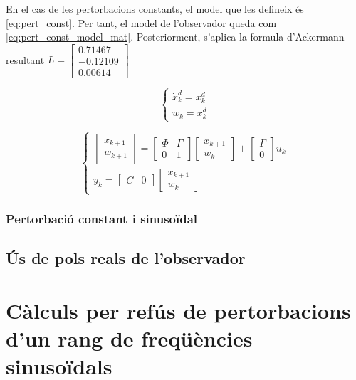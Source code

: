 \documentclass[12pt,a4paper,final,twoside,openright]{report}
\begin{document}
En el cas de les pertorbacions constants, el model que les defineix és \eqref{eq:pert_const}. Per tant, el model de l'observador queda com \eqref{eq:pert_const_model_mat}. Posteriorment, s'aplica la formula d'Ackermann resultant $L=\begin{bmatrix}
0.71467\\
-0.12109\\
0.00614
\end{bmatrix}$

\begin{equation}\label{eq:pert_const}
\left\{
\begin{array}{lr}
\dot{x}^d_k = x^d_k\\
w_k = x^d_k
\end{array}
\right.
\end{equation}

\begin{equation}\label{eq:pert_const_model_mat}
\left\{
\begin{array}{lr}
\begin{bmatrix}
x_{k+1}\\
w_{k+1}
\end{bmatrix} = 
\begin{bmatrix}
\Phi & \Gamma \\
0 & 1
\end{bmatrix} \begin{bmatrix}
x_{k+1}\\
w_k
\end{bmatrix} + 
\begin{bmatrix}
\Gamma\\
0
\end{bmatrix} u_k\\
y_k=\begin{bmatrix}
C & 0
\end{bmatrix} \begin{bmatrix}
x_{k+1}\\
w_k
\end{bmatrix}
\end{array}
\right.
\end{equation}

\subsection{Pertorbació constant i sinusoïdal}

\section{Ús de pols reals de l'observador}

%


\appendix
\clearpage %
\addappheadtotoc
\appendixpage

\chapter{Càlculs per refús de pertorbacions d'un rang de freqüències sinusoïdals}
\end{document}
